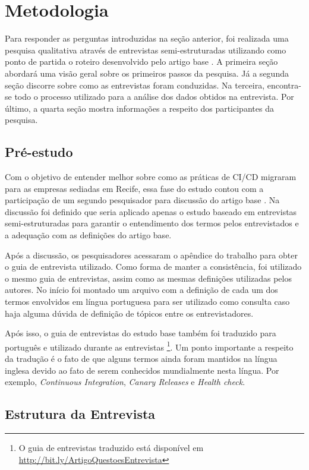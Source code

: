 
\section{Metodologia}

Para responder as perguntas introduzidas na seção anterior, foi realizada uma pesquisa qualitativa através de entrevistas semi-estruturadas utilizando como ponto de partida o roteiro desenvolvido pelo artigo base \cite{empiricalStudy2016}. A primeira seção abordará uma visão geral sobre os primeiros passos da pesquisa.  Já a segunda seção discorre sobre como as entrevistas foram conduzidas. Na terceira, encontra-se todo o processo utilizado para a análise dos dados obtidos na entrevista. Por último, a quarta seção mostra informações a respeito dos participantes da pesquisa.


\subsection{Pré-estudo}

Com o objetivo de entender melhor sobre como as práticas de CI/CD migraram para as empresas sediadas em Recife, essa fase do estudo contou com a participação de um segundo pesquisador para discussão do artigo base \cite{empiricalStudy2016}. Na discussão foi definido que seria aplicado apenas o estudo baseado em entrevistas semi-estruturadas para garantir o entendimento dos termos pelos entrevistados e a adequação com as definições do artigo base. 

Após a discussão, os pesquisadores acessaram o apêndice do trabalho para obter o guia de entrevista utilizado. Como forma de manter a consistência, foi utilizado o mesmo guia de entrevistas, assim como as mesmas definições utilizadas pelos autores. No início foi montado um arquivo com a definição de cada um dos termos envolvidos em língua portuguesa para ser utilizado como consulta caso haja alguma dúvida de definição de tópicos entre os entrevistadores.

Após isso, o guia de entrevistas do estudo base também foi traduzido para português e utilizado durante as entrevistas \footnote{O guia de entrevistas traduzido está disponível em \url{http://bit.ly/ArtigoQuestoesEntrevista}}. Um ponto importante a respeito da tradução é o fato de que alguns termos ainda foram mantidos na língua inglesa devido ao fato de serem conhecidos mundialmente nesta língua. Por exemplo, \emph{Continuous Integration}, \emph{Canary Releases} e \emph{Health check}.


\subsection{Estrutura da Entrevista}

